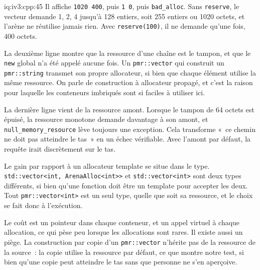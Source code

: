 \begin{solution}{iq:iv3:cpp:45}
Il affiche \texttt{1020 400}, puis \texttt{1 0}, puis \texttt{bad\_alloc}. Sans \texttt{reserve}, le vecteur demande 1, 2, 4 jusqu'à 128 entiers, soit 255 entiers ou 1020 octets, et l'arène ne réutilise jamais rien. Avec \texttt{reserve(100)}, il ne demande qu'une fois, 400 octets.

La deuxième ligne montre que la ressource d'une chaîne est le tampon, et que le \texttt{new} global n'a été appelé aucune fois. Un \texttt{pmr::vector} qui construit un \texttt{pmr::string} transmet son propre allocateur, si bien que chaque élément utilise la même ressource. On parle de construction à allocateur propagé, et c'est la raison pour laquelle les conteneurs imbriqués sont si faciles à utiliser ici.

La dernière ligne vient de la ressource amont. Lorsque le tampon de 64 octets est épuisé, la ressource monotone demande davantage à son amont, et \texttt{null\_memory\_resource} lève toujours une exception. Cela transforme «~ce chemin ne doit pas atteindre le tas~» en un échec vérifiable. Avec l'amont par défaut, la requête irait discrètement sur le tas.

Le gain par rapport à un allocateur template se situe dans le type. \texttt{std::vector<int, ArenaAlloc<int>{}>} et \texttt{std::vector<int>} sont deux types différents, si bien qu'une fonction doit être un template pour accepter les deux. Tout \texttt{pmr::vector<int>} est un seul type, quelle que soit sa ressource, et le choix se fait donc à l'exécution.

Le coût est un pointeur dans chaque conteneur, et un appel virtuel à chaque allocation, ce qui pèse peu lorsque les allocations sont rares. Il existe aussi un piège. La construction par copie d'un \texttt{pmr::vector} n'hérite pas de la ressource de la source~: la copie utilise la ressource par défaut, ce que montre notre test, si bien qu'une copie peut atteindre le tas sans que personne ne s'en aperçoive.

\end{solution}


